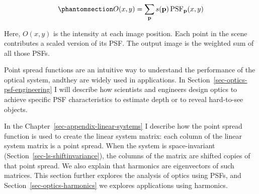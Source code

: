\documentclass[
  letterpaper,
]{book}
\begin{document}
\begin{equation}\phantomsection\label{eq-pointspread-1}{
O(x, y) = \sum_{\mathbf{p}} s(\mathbf{p})\, \text{PSF}_{\mathbf{p}}(x, y)
}\end{equation}

Here, \(O(x, y)\) is the intensity at each image position. Each point in
the scene contributes a scaled version of its PSF. The output image is
the weighted sum of all those PSFs.

Point spread functions are an intuitive way to understand the
performance of the optical system, andthey are widely used in
applications. In Section~\ref{sec-optics-psf-engineering} I will
describe how scientists and engineers design optics to achieve specific
PSF characteristics to estimate depth or to reveal hard-to-see objects.

In the Chapter~\ref{sec-appendix-linear-systems} I describe how the
point spread function is used to create the linear system matrix: each
column of the linear system matrix is a point spread. When the system is
space-invariant (Section~\ref{sec-ls-shiftinvariance}), the columns of
the matrix are shifted copies of that point spread. We also explain that
harmonics are eigenvectors of such matrices. This section further
explores the analysis of optics using PSFs, and
Section~\ref{sec-optics-harmonics} we explores applications using
harmonics.
\end{document}
